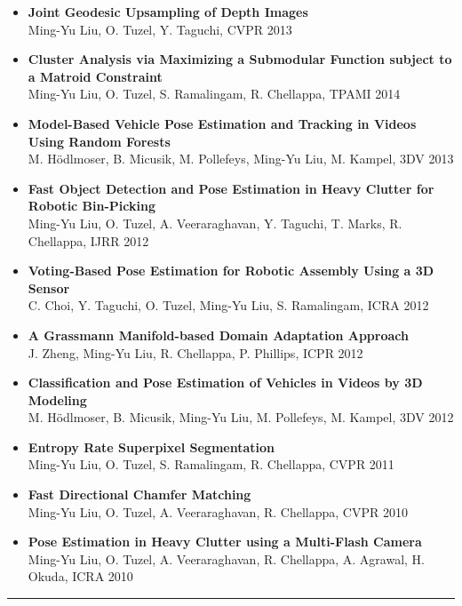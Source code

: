 \documentclass[10pt,letterpaper]{article}
\begin{document}
\begin{itemize}
\item {\bf Joint Geodesic Upsampling of Depth Images}\\      
      {Ming-Yu Liu}, O. Tuzel, Y. Taguchi, {CVPR} 2013\vspace{-2mm}
\item {\bf Cluster Analysis via Maximizing a Submodular Function subject to a Matroid Constraint}\\
      {Ming-Yu Liu}, O. Tuzel, S. Ramalingam, R. Chellappa, {TPAMI} 2014\vspace{-2mm}
\item {\bf Model-Based Vehicle Pose Estimation and Tracking in Videos Using Random Forests}\\
      M. Hödlmoser, B. Micusik, M. Pollefeys, {Ming-Yu Liu}, M. Kampel, {3DV} 2013\vspace{-2mm}
\item {\bf Fast Object Detection and Pose Estimation in Heavy Clutter for Robotic Bin-Picking}\\      
			{Ming-Yu Liu}, O. Tuzel, A. Veeraraghavan, Y. Taguchi, T. Marks, R. Chellappa, {IJRR} 2012\vspace{-2mm}
\item {\bf Voting-Based Pose Estimation for Robotic Assembly Using a 3D Sensor}\\
      C. Choi, Y. Taguchi, O. Tuzel, {Ming-Yu Liu}, S. Ramalingam, {ICRA} 2012\vspace{-2mm}
\item {\bf A Grassmann Manifold-based Domain Adaptation Approach}\\
			J. Zheng, {Ming-Yu Liu}, R. Chellappa, P. Phillips, {ICPR} 2012\vspace{-2mm}
\item {\bf Classification and Pose Estimation of Vehicles in Videos by 3D Modeling}\\%
      M. Hödlmoser, B. Micusik, {Ming-Yu Liu}, M. Pollefeys, M. Kampel, {3DV} 2012\vspace{-2mm}
\item {\bf Entropy Rate Superpixel Segmentation}\\                
			{Ming-Yu Liu}, O. Tuzel, S. Ramalingam, R. Chellappa, CVPR 2011\vspace{-2mm}
\item {\bf Fast Directional Chamfer Matching}\\                
			{Ming-Yu Liu}, O. Tuzel, A. Veeraraghavan, R. Chellappa, CVPR 2010\vspace{-2mm}
\item {\bf Pose Estimation in Heavy Clutter using a Multi-Flash Camera}\\
      {Ming-Yu Liu}, O. Tuzel, A. Veeraraghavan, R. Chellappa, A. Agrawal, H. Okuda, ICRA 2010\vspace{-2mm}
\end{itemize}
\hrule
\vspace{-0.4em}
\end{document}
